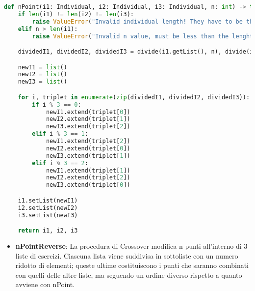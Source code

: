 \documentclass{article}
\begin{document}
\begin{lstlisting}[language=Python, breaklines, no caption]
def nPoint(i1: Individual, i2: Individual, i3: Individual, n: int) -> tuple[Individual, Individual, Individual]:
    if len(i1) != len(i2) != len(i3):
        raise ValueError("Invalid individual length! They have to be the same.")
    elif n > len(i1):
        raise ValueError("Invalid n value, must be less than the lenght of the individual!")

    dividedI1, dividedI2, dividedI3 = divide(i1.getList(), n), divide(i2.getList(), n), divide(i3.getList(), n)

    newI1 = list()
    newI2 = list()
    newI3 = list()

    for i, triplet in enumerate(zip(dividedI1, dividedI2, dividedI3)):
        if i % 3 == 0:
            newI1.extend(triplet[0])
            newI2.extend(triplet[1])
            newI3.extend(triplet[2])
        elif i % 3 == 1:
            newI1.extend(triplet[2])
            newI2.extend(triplet[0])
            newI3.extend(triplet[1])
        elif i % 3 == 2:
            newI1.extend(triplet[1])
            newI2.extend(triplet[2])
            newI3.extend(triplet[0])

    i1.setList(newI1)
    i2.setList(newI2)
    i3.setList(newI3)

    return i1, i2, i3
\end{lstlisting}

\pagebreak

\begin{itemize}
\item\textbf{nPointReverse}: La procedura di Crossover modifica n punti all'interno di 3 liste di esercizi. Ciascuna lista viene suddivisa in sottoliste con un numero ridotto di elementi; queste ultime costituiscono i punti che saranno combinati con quelli delle altre liste, ma seguendo un ordine diverso rispetto a quanto avviene con nPoint.
\end{itemize}
\end{document}
